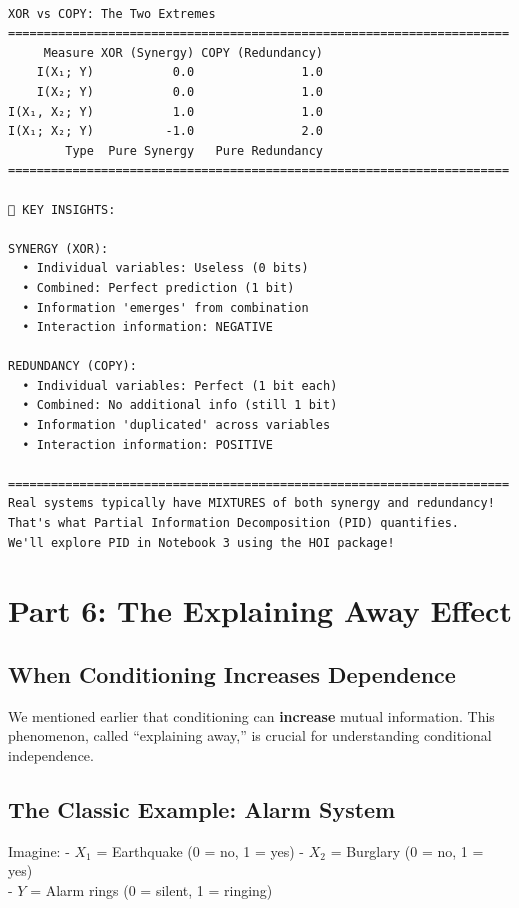 \documentclass[
  11pt,
  letterpaper,
  oneside,
  openany]{book}
\begin{document}
\begin{verbatim}

XOR vs COPY: The Two Extremes
======================================================================
     Measure XOR (Synergy) COPY (Redundancy)
    I(X₁; Y)           0.0               1.0
    I(X₂; Y)           0.0               1.0
I(X₁, X₂; Y)           1.0               1.0
I(X₁; X₂; Y)          -1.0               2.0
        Type  Pure Synergy   Pure Redundancy
======================================================================

🎯 KEY INSIGHTS:

SYNERGY (XOR):
  • Individual variables: Useless (0 bits)
  • Combined: Perfect prediction (1 bit)
  • Information 'emerges' from combination
  • Interaction information: NEGATIVE

REDUNDANCY (COPY):
  • Individual variables: Perfect (1 bit each)
  • Combined: No additional info (still 1 bit)
  • Information 'duplicated' across variables
  • Interaction information: POSITIVE

======================================================================
Real systems typically have MIXTURES of both synergy and redundancy!
That's what Partial Information Decomposition (PID) quantifies.
We'll explore PID in Notebook 3 using the HOI package!
\end{verbatim}

\section{Part 6: The Explaining Away
Effect}\label{part-6-the-explaining-away-effect}

\subsection{When Conditioning Increases
Dependence}\label{when-conditioning-increases-dependence}

We mentioned earlier that conditioning can \textbf{increase} mutual
information. This phenomenon, called ``explaining away,'' is crucial for
understanding conditional independence.

\subsection{The Classic Example: Alarm
System}\label{the-classic-example-alarm-system}

Imagine: - \(X_1\) = Earthquake (0 = no, 1 = yes) - \(X_2\) = Burglary
(0 = no, 1 = yes)\\
- \(Y\) = Alarm rings (0 = silent, 1 = ringing)
\end{document}
